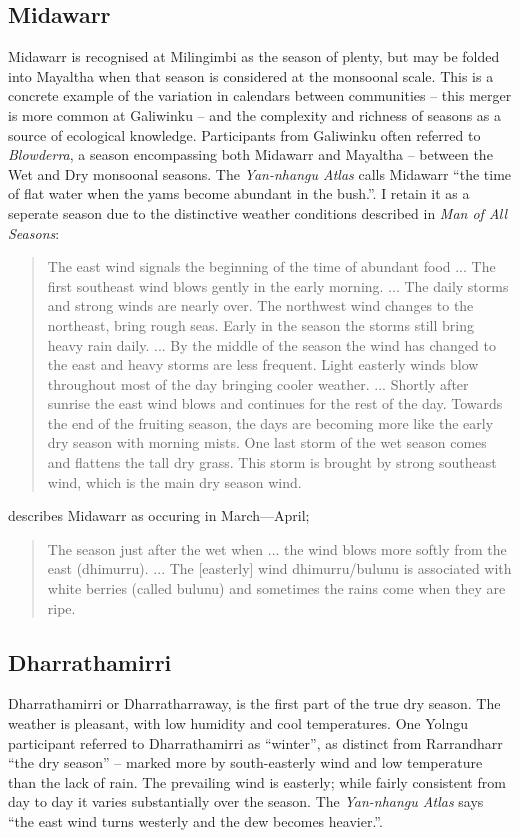 \subsection{Midawarr}
Midawarr is recognised at Milingimbi as the season of plenty,
but may be folded into Mayaltha when that season is considered at the
monsoonal scale.  This is a concrete example of the variation in calendars
between communities -- this merger is more common at Galiwinku -- and the
complexity and richness of seasons as a source of ecological knowledge.
%
Participants from Galiwinku often referred to \textit{Blowderra}, a season
encompassing both Midawarr and Mayaltha -- between the Wet and Dry monsoonal
seasons.  The \textit{Yan-nhangu Atlas} calls Midawarr ``the time of flat
water when the yams become abundant in the bush.''. I retain it as a
seperate season due to the distinctive weather conditions described in
\textit{Man of All Seasons}:
\begin{quote}
    The east wind signals the beginning of the time of abundant food ...
    The first southeast wind blows gently in the early morning. ...
    The daily storms and strong winds are nearly over.
    The northwest wind changes to the northeast, bring rough seas.
    Early in the season the storms still bring heavy rain daily.
    ...
    By the middle of the season the wind has changed to the east and
    heavy storms are less frequent.  Light easterly winds blow
    throughout most of the day bringing cooler weather.
    ...
    Shortly after sunrise the east wind blows and continues for the
    rest of the day.  Towards the end of the fruiting season, the days
    are becoming  more like the early dry season with morning mists.
    One last storm of the wet season comes and flattens the tall dry grass.
    This storm is brought by strong southeast wind, which is the main dry season wind.
\end{quote}
%
\citet{barber2005} describes Midawarr as occuring in March---April;
\begin{quote}
The season just after the wet when ... the wind blows more softly from the east
(dhimurru). ... The [easterly] wind dhimurru/bulunu is associated with white berries
(called bulunu) and sometimes the rains come when they are ripe.
\end{quote}


\subsection{Dharrathamirri}
Dharrathamirri or Dharratharraway, is the first part of the
true dry season.  The weather is pleasant, with low humidity and cool
temperatures.  One Yolngu participant referred to Dharrathamirri as ``winter'',
as distinct from Rarrandharr ``the dry season'' -- marked more by south-easterly wind
and low temperature than the lack of rain.
%
The prevailing wind is easterly; while fairly consistent from day to day
it varies substantially over the season.  The \textit{Yan-nhangu Atlas}
says ``the east wind turns westerly and the dew becomes heavier.''.

